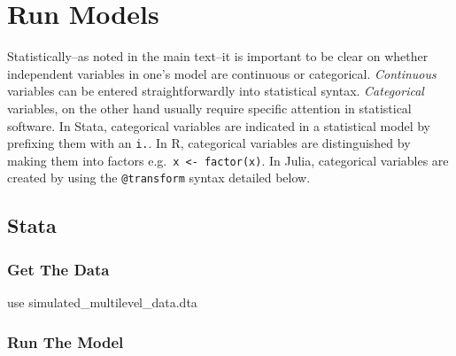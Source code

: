 \documentclass[
  letterpaper,
  DIV=11,
  numbers=noendperiod]{scrreprt}
\newenvironment{Shaded}{\begin{snugshade}}{\end{snugshade}}
\newcommand{\KeywordTok}[1]{\textcolor[rgb]{0.00,0.23,0.31}{#1}}
\newcommand{\NormalTok}[1]{\textcolor[rgb]{0.00,0.23,0.31}{#1}}
\begin{document}
\section{Run Models}\label{run-models-2}

\begin{tcolorbox}[enhanced jigsaw, colback=white, left=2mm, arc=.35mm, breakable, colbacktitle=quarto-callout-warning-color!10!white, colframe=quarto-callout-warning-color-frame, leftrule=.75mm, opacityback=0, titlerule=0mm, title=\textcolor{quarto-callout-warning-color}{\faExclamationTriangle}\hspace{0.5em}{Continuous and Categorical Variables}, toptitle=1mm, toprule=.15mm, bottomrule=.15mm, bottomtitle=1mm, rightrule=.15mm, opacitybacktitle=0.6, coltitle=black]

Statistically--as noted in the main text--it is important to be clear on
whether independent variables in one's model are continuous or
categorical. \emph{Continuous} variables can be entered
straightforwardly into statistical syntax. \emph{Categorical} variables,
on the other hand usually require specific attention in statistical
software. In Stata, categorical variables are indicated in a statistical
model by prefixing them with an \texttt{i.}. In R, categorical variables
are distinguished by making them into factors
e.g.~\texttt{x\ \textless{}-\ factor(x)}. In Julia, categorical
variables are created by using the \texttt{@transform} syntax detailed
below.

\end{tcolorbox}

\subsection{Stata}

\subsubsection{Get The Data}\label{get-the-data}

\begin{Shaded}
\begin{Highlighting}[]

\KeywordTok{use}\NormalTok{ simulated\_multilevel\_data.dta}
\end{Highlighting}
\end{Shaded}

\subsubsection{Run The Model}\label{run-the-model}
\end{document}
